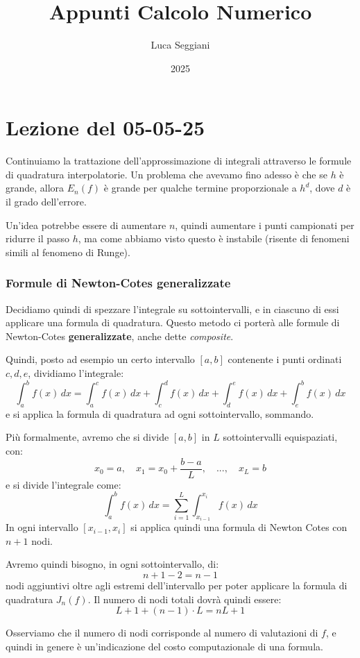 \documentclass[a4paper,11pt]{article}
\title{Appunti Calcolo Numerico}
\author{Luca Seggiani}
\date{2025}
\begin{document}
\section{Lezione del 05-05-25}

\thispagestyle{empty}
\pagestyle{fancy}

Continuiamo la trattazione dell'approssimazione di integrali attraverso le formule di quadratura interpolatorie.
Un problema che avevamo fino adesso è che se $h$ è grande, allora $E_n(f)$ è grande per qualche termine proporzionale a $h^d$, dove $d$ è il grado dell'errore.

Un'idea potrebbe essere di aumentare $n$, quindi aumentare i punti campionati per ridurre il passo $h$, ma come abbiamo visto questo è instabile (risente di fenomeni simili al fenomeno di Runge).

\subsubsection{Formule di Newton-Cotes generalizzate}
Decidiamo quindi di spezzare l'integrale su sottointervalli, e in ciascuno di essi applicare una formula di quadratura.
Questo metodo ci porterà alle formule di Newton-Cotes \textbf{generalizzate}, anche dette \textit{composite}.

Quindi, posto ad esempio un certo intervallo $[a, b]$ contenente i punti ordinati $c, d, e$, dividiamo l'integrale:
$$
\int_a^b f(x) \, dx = \int_a^c f(x) \, dx + \int_c^d f(x) \, dx + \int_d^e f(x) \, dx + \int_e^b f(x) \, dx
$$
e si applica la formula di quadratura ad ogni sottointervallo, sommando.

Più formalmente, avremo che si divide $[a, b]$ in $L$ sottointervalli equispaziati, con:
$$
x_0 = a, \quad x_1 = x_0 + \frac{b - a}{L}, \quad ..., \quad x_L = b
$$
e si divide l'integrale come:
$$
\int_a^b f(x) \, dx = \sum_{i = 1}^L \int_{x_{i - 1}}^{x_i} f(x) \, dx
$$
In ogni intervallo $[x_{i - 1}, x_i]$ si applica quindi una formula di Newton Cotes con $n + 1$ nodi.

Avremo quindi bisogno, in ogni sottointervallo, di:
$$
n + 1 - 2 = n - 1
$$ 
nodi aggiuntivi oltre agli estremi dell'intervallo per poter applicare la formula di quadratura $J_n(f)$.
Il numero di nodi totali dovrà quindi essere:
$$
L + 1 + (n - 1) \cdot L = nL + 1
$$

Osserviamo che il numero di nodi corrisponde al numero di valutazioni di $f$, e quindi in genere è un'indicazione del costo computazionale di una formula. 
\end{document}

